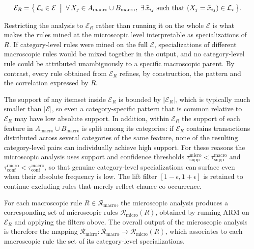 \begin{equation}
  \mathcal{E}_R = \bigl\{\, \mathcal{L}_i \in \mathcal{E} \;\bigm|\;
  \forall\, X_j \in A_{\mathrm{macro}} \cup B_{\mathrm{macro}},\;
  \exists\, \tilde{x}_{ij} \text{ such that } (X_j = \tilde{x}_{ij}) \in \mathcal{L}_i \,\bigr\}.
\end{equation}

Restricting the analysis to $\mathcal{E}_R$ rather than running it on the whole $\mathcal{E}$ is what makes the rules mined at the microscopic level interpretable as specializations of $R$. If category-level rules were mined on the full $\mathcal{E}$, specializations of different macroscopic rules would be mixed together in the output, and no category-level rule could be attributed unambiguously to a specific macroscopic parent. By contrast, every rule obtained from $\mathcal{E}_R$ refines, by construction, the pattern and the correlation expressed by $R$.

The support of any itemset inside $\mathcal{E}_R$ is bounded by $|\mathcal{E}_R|$, which is typically much smaller than $|\mathcal{E}|$, so even a category-specific pattern that is common relative to $\mathcal{E}_R$ may have low absolute support. In addition, within $\mathcal{E}_R$ the support of each feature in $A_{\mathrm{macro}} \cup B_{\mathrm{macro}}$ is split among its categories: if $\mathcal{E}_R$ contains transactions distributed across several categories of the same feature, none of the resulting category-level pairs can individually achieve high support. For these reasons the microscopic analysis uses support and confidence thresholds $\tau_{\mathrm{supp}}^{\mathrm{micro}} < \tau_{\mathrm{supp}}^{\mathrm{macro}}$ and $\tau_{\mathrm{conf}}^{\mathrm{micro}} < \tau_{\mathrm{conf}}^{\mathrm{macro}}$, so that genuine category-level specializations can surface even when their absolute frequency is low. The lift filter $[1-\epsilon, 1+\epsilon]$ is retained to continue excluding rules that merely reflect chance co-occurrence.

For each macroscopic rule $R \in \mathcal{R}_{\mathrm{macro}}$, the microscopic analysis produces a corresponding set of microscopic rules $\mathcal{R}_{\mathrm{micro}}(R)$, obtained by running ARM on $\mathcal{E}_R$ and applying the filters above. The overall output of the microscopic analysis is therefore the mapping $\mathcal{R}_{\mathrm{micro}} : \mathcal{R}_{\mathrm{macro}} \to \mathcal{R}_{\mathrm{micro}}(R)$, which associates to each macroscopic rule the set of its category-level specializations.

